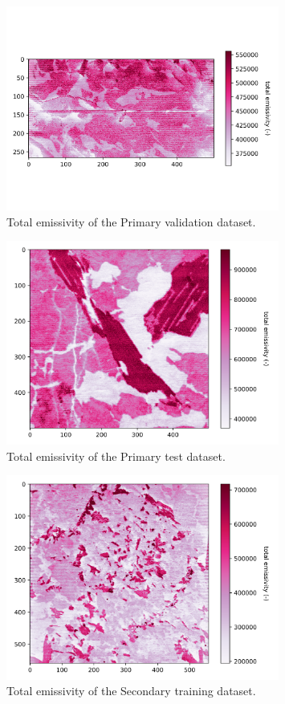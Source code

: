 \documentclass[preprint,11pt]{elsarticle}
\begin{document}
\begin{figure}[!htb]
    \centering
    \includegraphics[width=0.8\textwidth]{original_s1_val_emissivity.png}
    \caption{Total emissivity of the Primary validation dataset.}
\end{figure}

\begin{figure}[!htb]
    \centering
    \includegraphics[width=0.8\textwidth]{original_s1_test_emissivity.png}
    \caption{Total emissivity of the Primary test dataset.}
\end{figure}

\begin{figure}[!htb]
    \centering
    \includegraphics[width=0.8\textwidth]{original_s2_train_emissivity.png}
    \caption{Total emissivity of the Secondary training dataset.}
\end{figure}
\end{document}
